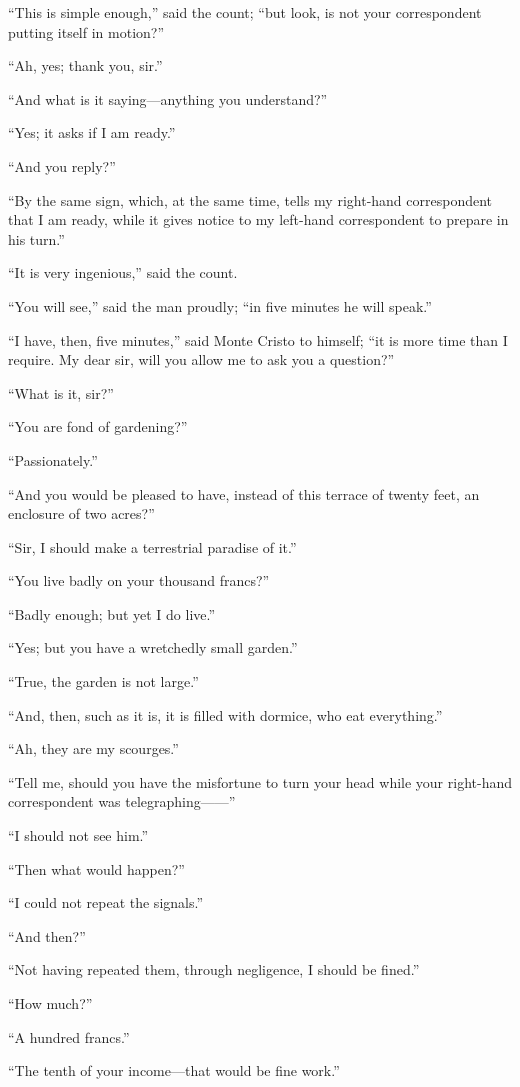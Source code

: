 “This is simple enough,” said the count; “but look, is not your
correspondent putting itself in motion?”

“Ah, yes; thank you, sir.”

“And what is it saying—anything you understand?”

“Yes; it asks if I am ready.”

“And you reply?”

“By the same sign, which, at the same time, tells my right-hand
correspondent that I am ready, while it gives notice to my left-hand
correspondent to prepare in his turn.”

“It is very ingenious,” said the count.

“You will see,” said the man proudly; “in five minutes he will speak.”

“I have, then, five minutes,” said Monte Cristo to himself; “it is more
time than I require. My dear sir, will you allow me to ask you a
question?”

“What is it, sir?”

“You are fond of gardening?”

“Passionately.”

“And you would be pleased to have, instead of this terrace of twenty
feet, an enclosure of two acres?”

“Sir, I should make a terrestrial paradise of it.”

“You live badly on your thousand francs?”

“Badly enough; but yet I do live.”

“Yes; but you have a wretchedly small garden.”

“True, the garden is not large.”

“And, then, such as it is, it is filled with dormice, who eat
everything.”

“Ah, they are my scourges.”

“Tell me, should you have the misfortune to turn your head while your
right-hand correspondent was telegraphing——”

“I should not see him.”

“Then what would happen?”

“I could not repeat the signals.”

“And then?”

“Not having repeated them, through negligence, I should be fined.”

“How much?”

“A hundred francs.”

“The tenth of your income—that would be fine work.”

